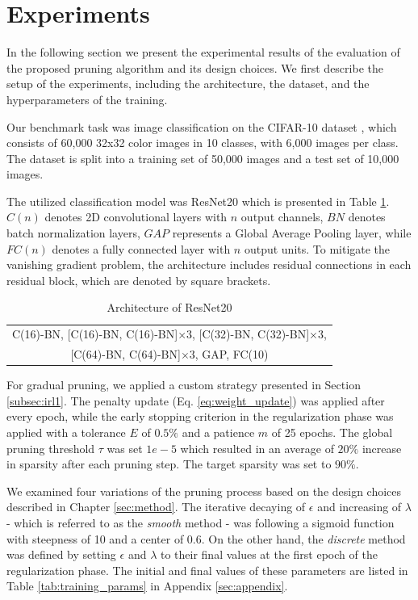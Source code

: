 \section{Experiments}\label{sec:exp}

In the following section we present the experimental results of the evaluation of the proposed pruning algorithm and its design choices.
We first describe the setup of the experiments, including the architecture, the dataset, and the hyperparameters of the training.

Our benchmark task was image classification on the CIFAR-10 dataset \cite{cifar10}, which consists of 60,000 32x32 color images in 10 classes,
with 6,000 images per class. The dataset is split into a training set of 50,000 images and a test set of 10,000 images.

The utilized classification model was ResNet20 \cite{resnet20} which is presented in Table \ref{tab:resnet20}.
 $C(n)$ denotes 2D convolutional layers with $n$ output channels, $BN$ denotes
batch normalization layers, $GAP$ represents a Global Average Pooling layer, while $FC(n)$ denotes a fully connected layer with $n$ output units. 
To mitigate the vanishing gradient problem, the architecture includes residual connections in each residual block, which are denoted by square brackets.

\begin{table}[H]
\centering
\begin{tabular}{|c|}
    \hline
    C(16)-BN, [C(16)-BN, C(16)-BN]$\times3$, [C(32)-BN, C(32)-BN]$\times3$, \\ {}
    [C(64)-BN, C(64)-BN]$\times3$, GAP, FC(10) \\ \hline
\end{tabular}
\caption{Architecture of ResNet20}
\label{tab:resnet20}
\end{table}

For gradual pruning, we applied a custom strategy presented in Section \ref{subsec:irl1}. The penalty update (Eq. \ref{eq:weight_update})
was applied after every epoch, while the early stopping criterion in the regularization phase was applied with a tolerance $E$ of $0.5\%$
and a patience $m$ of 25 epochs. 
The global pruning threshold $\tau$ was set $1e-5$ which resulted in an average of $20\%$ increase in sparsity after each pruning step. The 
target sparsity was set to $90\%$.

We examined four variations of the pruning process based on the design choices described in Chapter \ref{sec:method}. 
The iterative decaying of $\epsilon$ and increasing of $\lambda$ - which is referred to as the \textit{smooth} method - was following a sigmoid function
with steepness of 10 and a center of 0.6. On the other hand, the \textit{discrete} method was defined by setting $\epsilon$ and $\lambda$ 
to their final values at the first epoch of the regularization phase. 
The initial and final values of these parameters are listed in Table \ref{tab:training_params} in Appendix \ref{sec:appendix}. 

